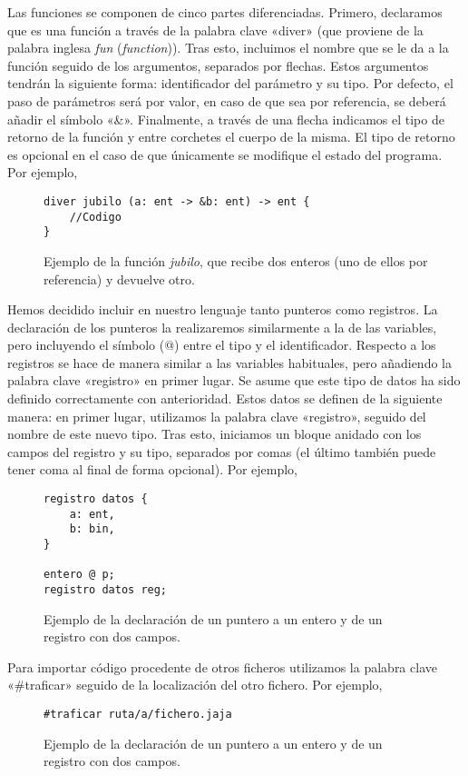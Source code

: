 Las funciones se componen de cinco partes diferenciadas. Primero, declaramos que
es una función a través de la palabra clave «diver» (que proviene de la palabra
inglesa \textit{fun} (\textit{function})). Tras esto, incluimos el nombre que se
le da a la función seguido de los argumentos, separados por flechas. Estos
argumentos tendrán la siguiente forma: identificador del parámetro y su tipo.
Por defecto, el paso de parámetros será por valor, en caso de que sea por
referencia, se deberá añadir el símbolo «\&».
Finalmente, a través de una flecha indicamos el tipo de retorno de la función y
entre corchetes el cuerpo de la misma. El tipo de retorno es opcional en el caso
de que únicamente se modifique el estado del programa. Por ejemplo,
\begin{figure}[H]
    \centering
    \begin{lstlisting}
diver jubilo (a: ent -> &b: ent) -> ent {
    //Codigo
}
    \end{lstlisting}
    \caption{Ejemplo de la función \textit{jubilo}, que recibe dos enteros (uno
        de ellos por referencia) y devuelve otro.}
\end{figure}

Hemos decidido incluir en nuestro lenguaje tanto punteros como registros. La
declaración de los punteros la realizaremos similarmente a la de las variables,
pero incluyendo el símbolo (@) entre el tipo y el identificador. Respecto a los
registros se hace de manera similar a las variables habituales, pero añadiendo
la palabra clave «registro» en primer lugar. Se asume que este tipo de datos ha
sido definido correctamente con anterioridad. Estos datos se definen de la
siguiente manera: en primer lugar, utilizamos la palabra clave «registro»,
seguido del nombre de este nuevo tipo. Tras esto, iniciamos un bloque anidado
con los campos del registro y su tipo, separados por comas (el último también
puede tener coma al final de forma opcional). Por ejemplo,
\begin{figure}[H]
    \centering
    \begin{lstlisting}
registro datos {
    a: ent,
    b: bin,
}

entero @ p;
registro datos reg;
    \end{lstlisting}
    \caption{Ejemplo de la declaración de un puntero a un entero y de un
    registro con dos campos.}
\end{figure}

Para importar código procedente de otros ficheros utilizamos la palabra clave
«\#traficar» seguido de la localización del otro fichero. Por ejemplo,
\begin{figure}[H]
    \centering
    \begin{lstlisting}
#traficar ruta/a/fichero.jaja
    \end{lstlisting}
    \caption{Ejemplo de la declaración de un puntero a un entero y de un
    registro con dos campos.}
\end{figure}

